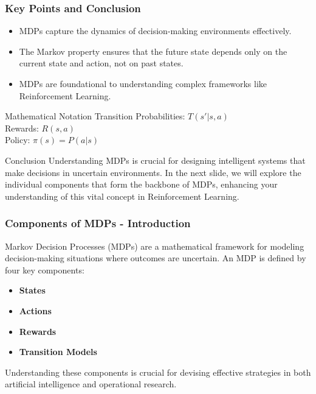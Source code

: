 \documentclass[aspectratio=169]{beamer}
\begin{document}
\begin{frame}[fragile]
    \frametitle{Key Points and Conclusion}
    \begin{itemize}
        \item MDPs capture the dynamics of decision-making environments effectively.
        \item The Markov property ensures that the future state depends only on the current state and action, not on past states.
        \item MDPs are foundational to understanding complex frameworks like Reinforcement Learning.
    \end{itemize}
    
    \begin{block}{Mathematical Notation}
        Transition Probabilities: \( T(s'|s,a) \) \\
        Rewards: \( R(s,a) \) \\
        Policy: \( \pi(s) = P(a|s) \)
    \end{block}
    
    \begin{block}{Conclusion}
        Understanding MDPs is crucial for designing intelligent systems that make decisions in uncertain environments. 
        In the next slide, we will explore the individual components that form the backbone of MDPs, enhancing your understanding of this vital concept in Reinforcement Learning.
    \end{block}
\end{frame}

\begin{frame}[fragile]
    \frametitle{Components of MDPs - Introduction}
    Markov Decision Processes (MDPs) are a mathematical framework for modeling decision-making situations where outcomes are uncertain. 
    An MDP is defined by four key components:
    
    \begin{itemize}
        \item \textbf{States}
        \item \textbf{Actions}
        \item \textbf{Rewards}
        \item \textbf{Transition Models}
    \end{itemize}
    
    Understanding these components is crucial for devising effective strategies in both artificial intelligence and operational research.
\end{frame}
\end{document}
